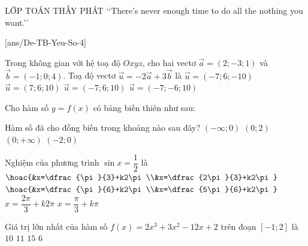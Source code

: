 \begin{name}
	{\tenchude}
	{\tendethi}
	{LỚP TOÁN THẦY PHÁT}
	{\lq\lq There's never enough time to do all the nothing you want.\rq\rq}
\end{name}

[ans/De-TB-Yeu-So-4]
\TN
\begin{ex}
	Trong không gian với hệ toạ độ $Oxyz$, cho hai vectơ $\overrightarrow{a}=(2;-3;1)$ và $\overrightarrow{b}=(-1;0;4)$. Toạ độ vectơ $\overrightarrow{u}=-2\overrightarrow{a}+3\overrightarrow{b}$ là
	\choice
	{$\overrightarrow{u}=(-7;6;-10)$}
	{$\overrightarrow{u}=(7;6;10)$}
	{\True $\overrightarrow{u}=(-7;6;10)$}
	{$\overrightarrow{u}=(-7;-6;10)$}
\end{ex}

\begin{ex}
	Cho hàm số $y=f(x)$ có bảng biến thiên như sau:
	\begin{center}
	\end{center}
	Hàm số đã cho đồng biến trong khoảng nào sau đây?
	\choice
	{$(-\infty;0)$}
	{\True $(0;2)$}
	{$(0;+\infty)$}
	{$(-2;0)$}
\end{ex}

\begin{ex}
	Nghiệm của phương trình $\sin x=\dfrac{1}{2}$ là
	\choice
	{$\hoac{&x=\dfrac{\pi}{3}+k2\pi\\&x=\dfrac{2\pi}{3}+k2\pi}$}
	{\True $\hoac{&x=\dfrac{\pi}{6}+k2\pi\\&x=\dfrac{5\pi}{6}+k2\pi}$}
	{$x=\dfrac{2\pi}{3}+k2\pi$}
	{$x=\dfrac{\pi}{3}+k\pi$}
\end{ex}

\begin{ex}
	Giá trị lớn nhất của hàm số $f(x)=2x^3+3x^2-12x+2$ trên đoạn $[-1;2]$ là
	\choice
	{$10$}
	{$11$}
	{\True $15$}
	{$6$}
\end{ex}

